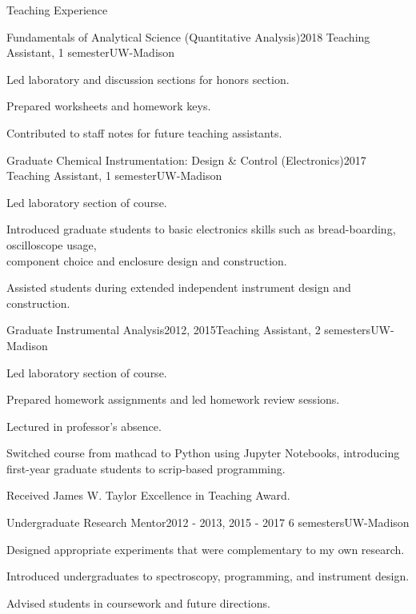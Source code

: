 \documentclass{resume}  %
\begin{document}
\begin{rSection}{Teaching Experience}
  \begin{rSubsection}{Fundamentals of Analytical Science (Quantitative Analysis)}{2018}
    {Teaching Assistant, 1 semester}{UW-Madison}
    \item Led laboratory and discussion sections for honors section.
    \item Prepared worksheets and homework keys.
    \item Contributed to staff notes for future teaching assistants.
  \end{rSubsection}
  \begin{rSubsection}{Graduate Chemical Instrumentation: Design \& Control (Electronics)}{2017}
    {Teaching Assistant, 1 semester}{UW-Madison}
    \item Led laboratory section of course.
    \item Introduced graduate students to basic electronics skills such as bread-boarding,
      oscilloscope usage, \\ component choice and enclosure design and construction.
    \item Assisted students during extended independent instrument design and construction.
  \end{rSubsection}
  \begin{rSubsection}{Graduate Instrumental Analysis}{2012, 2015}{Teaching Assistant, 2
      semesters}{UW-Madison}
    \item Led laboratory section of course.
    \item Prepared homework assignments and led
      homework review sessions.
    \item Lectured in professor's absence.
    \item Switched course from mathcad to Python using Jupyter Notebooks, introducing \\
      first-year graduate students to scrip-based programming.
    \item Received James W. Taylor Excellence in Teaching Award.
  \end{rSubsection}
  \begin{rSubsection}{Undergraduate Research Mentor}{2012 - 2013, 2015 - 2017}
    {6 semesters}{UW-Madison}
    \item Designed appropriate experiments that were complementary to my own research.
    \item Introduced undergraduates to spectroscopy, programming, and instrument design.
    \item Advised students in coursework and future directions.

\end{rSubsection}
\end{rSection}
\end{document}
